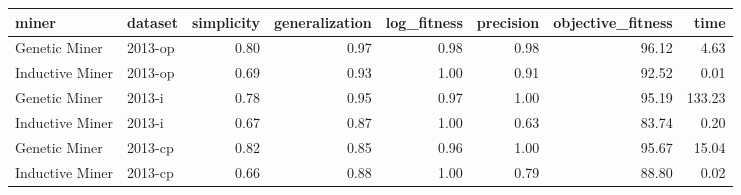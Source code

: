 \begin{tabular}{llrrrrrr}
\toprule
miner & dataset & simplicity & generalization & log_fitness & precision & objective_fitness & time \\
\midrule
Genetic Miner & 2013-op & 0.80 & 0.97 & 0.98 & 0.98 & 96.12 & 4.63 \\
Inductive Miner & 2013-op & 0.69 & 0.93 & 1.00 & 0.91 & 92.52 & 0.01 \\

Genetic Miner & 2013-i & 0.78 & 0.95 & 0.97 & 1.00 & 95.19 & 133.23 \\
Inductive Miner & 2013-i & 0.67 & 0.87 & 1.00 & 0.63 & 83.74 & 0.20 \\

Genetic Miner & 2013-cp & 0.82 & 0.85 & 0.96 & 1.00 & 95.67 & 15.04 \\
Inductive Miner & 2013-cp & 0.66 & 0.88 & 1.00 & 0.79 & 88.80 & 0.02 \\
\bottomrule
\end{tabular}
